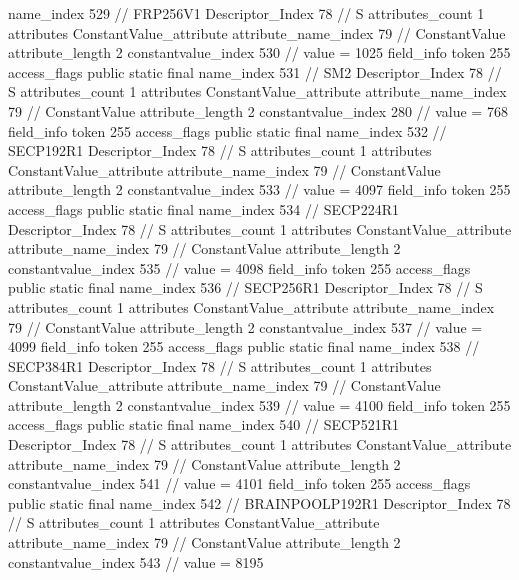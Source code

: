 {{{{{				name_index	529		// FRP256V1
				Descriptor_Index	78		// S
				attributes_count	1
				attributes {
				ConstantValue_attribute {
					attribute_name_index	79		// ConstantValue
					attribute_length	2
					constantvalue_index	530		// value = 1025
				}
				}
			}
			field_info {
				token	255
				access_flags	public static final
				name_index	531		// SM2
				Descriptor_Index	78		// S
				attributes_count	1
				attributes {
				ConstantValue_attribute {
					attribute_name_index	79		// ConstantValue
					attribute_length	2
					constantvalue_index	280		// value = 768
				}
				}
			}
			field_info {
				token	255
				access_flags	public static final
				name_index	532		// SECP192R1
				Descriptor_Index	78		// S
				attributes_count	1
				attributes {
				ConstantValue_attribute {
					attribute_name_index	79		// ConstantValue
					attribute_length	2
					constantvalue_index	533		// value = 4097
				}
				}
			}
			field_info {
				token	255
				access_flags	public static final
				name_index	534		// SECP224R1
				Descriptor_Index	78		// S
				attributes_count	1
				attributes {
				ConstantValue_attribute {
					attribute_name_index	79		// ConstantValue
					attribute_length	2
					constantvalue_index	535		// value = 4098
				}
				}
			}
			field_info {
				token	255
				access_flags	public static final
				name_index	536		// SECP256R1
				Descriptor_Index	78		// S
				attributes_count	1
				attributes {
				ConstantValue_attribute {
					attribute_name_index	79		// ConstantValue
					attribute_length	2
					constantvalue_index	537		// value = 4099
				}
				}
			}
			field_info {
				token	255
				access_flags	public static final
				name_index	538		// SECP384R1
				Descriptor_Index	78		// S
				attributes_count	1
				attributes {
				ConstantValue_attribute {
					attribute_name_index	79		// ConstantValue
					attribute_length	2
					constantvalue_index	539		// value = 4100
				}
				}
			}
			field_info {
				token	255
				access_flags	public static final
				name_index	540		// SECP521R1
				Descriptor_Index	78		// S
				attributes_count	1
				attributes {
				ConstantValue_attribute {
					attribute_name_index	79		// ConstantValue
					attribute_length	2
					constantvalue_index	541		// value = 4101
				}
				}
			}
			field_info {
				token	255
				access_flags	public static final
				name_index	542		// BRAINPOOLP192R1
				Descriptor_Index	78		// S
				attributes_count	1
				attributes {
				ConstantValue_attribute {
					attribute_name_index	79		// ConstantValue
					attribute_length	2
					constantvalue_index	543		// value = 8195
				}
				}
			}
}}}}

